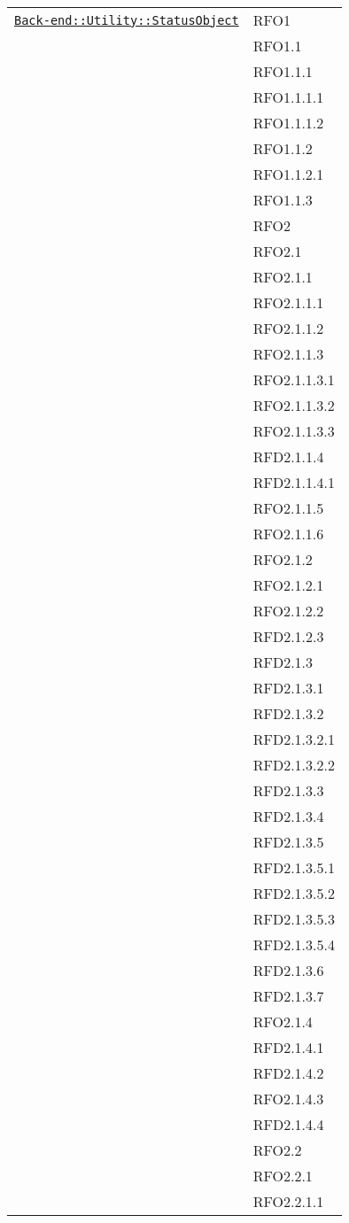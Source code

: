 \begin{longtable}{|>{\centering}m{10cm}|m{3cm}<{\centering}|}
\hyperref[Back-end::Utility::StatusObject]{\texttt{Back-end::Utility::StatusObject}} & RFO1\\
& RFO1.1\\
& RFO1.1.1\\
& RFO1.1.1.1\\
& RFO1.1.1.2\\
& RFO1.1.2\\
& RFO1.1.2.1\\
& RFO1.1.3\\
& RFO2\\
& RFO2.1\\
& RFO2.1.1\\
& RFO2.1.1.1\\
& RFO2.1.1.2\\
& RFO2.1.1.3\\
& RFO2.1.1.3.1\\
& RFO2.1.1.3.2\\
& RFO2.1.1.3.3\\
& RFD2.1.1.4\\
& RFD2.1.1.4.1\\
& RFO2.1.1.5\\
& RFO2.1.1.6\\
& RFO2.1.2\\
& RFO2.1.2.1\\
& RFO2.1.2.2\\
& RFD2.1.2.3\\
& RFD2.1.3\\
& RFD2.1.3.1\\
& RFD2.1.3.2\\
& RFD2.1.3.2.1\\
& RFD2.1.3.2.2\\
& RFD2.1.3.3\\
& RFD2.1.3.4\\
& RFD2.1.3.5\\
& RFD2.1.3.5.1\\
& RFD2.1.3.5.2\\
& RFD2.1.3.5.3\\
& RFD2.1.3.5.4\\
& RFD2.1.3.6\\
& RFD2.1.3.7\\
& RFO2.1.4\\
& RFD2.1.4.1\\
& RFD2.1.4.2\\
& RFO2.1.4.3\\
& RFD2.1.4.4\\
& RFO2.2\\
& RFO2.2.1\\
& RFO2.2.1.1\\

\end{longtable}
